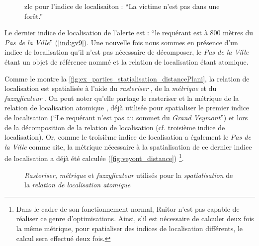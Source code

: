 \begin{figure}
  \centering
  
  \caption{\ac{zlc} pour l'indice de localisaiton : \enquote{La
      victime n'est pas dans une forêt.}}
  \label{fig:ZLC_GrandVeymont_8}
\end{figure}

Le dernier indice de localisation de l'alerte est : \enquote{le
  requérant est à 800 mètres du \emph{Pas de la Ville}}
(\ref{ind:gv9}). Une nouvelle fois nous sommes en présence d'un indice
de localisation qu'il n'est pas nécessaire de décomposer, le \emph{Pas
  de la Ville} étant un objet de référence nommé et la relation de
localisation  étant
atomique.

Comme le montre la
\autoref{fig:ex_parties_statialisation_distancePlani}, la relation de
localisation  est
spatialisée à l'aide du \emph{rasteriser} , de
la \emph{métrique}  et du
\emph{fuzzyficateur} . On peut noter qu'elle
partage le rasteriser et la métrique de la relation de localisation
atomique , déjà utilisée pour
spatialiser le premier indice de localisation (\enquote{Le requérant
  n'est pas au sommet du \emph{Grand Veymont}}) et lors de la
décomposition de la relation de localisation
 (cf. troisième indice de
localisation). Or, comme le troisième indice de localisation a
également le \emph{Pas de la Ville} comme site, la métrique nécessaire
à la spatialisation de ce dernier indice de localisation a déjà été
calculée (\autoref{fig:veyont_distance}) \footnote{Dans le cadre de
  son fonctionnement normal, Ruitor n'est pas capable de réaliser ce
  genre d'optimisations. Ainsi, s'il est nécessaire de calculer deux
  fois la même métrique, pour spatialiser des indices de localisation
  différents, le calcul sera effectué deux fois.}.

\begin{figure}
  \centering
  
  \caption{\emph{Rasteriser,} \emph{métrique} et \emph{fuzzyficateur}
    utilisés pour la \emph{spatialisation} de la \emph{relation de
      localisation atomique}
    \protect{}}
  \label{fig:ex_parties_statialisation_distancePlani}
\end{figure}

